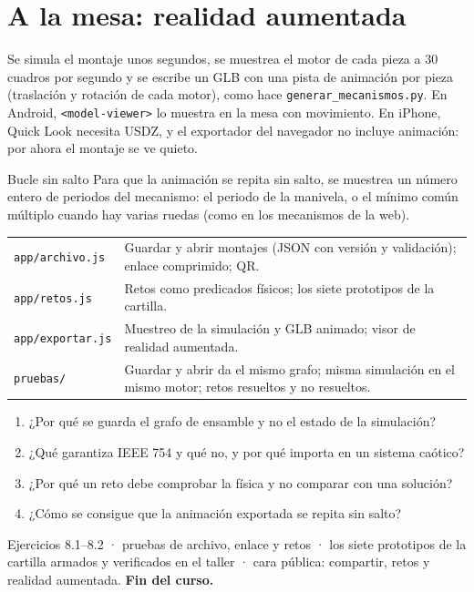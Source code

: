 \documentclass[11pt,a4paper]{article}
\begin{document}
\section{A la mesa: realidad aumentada}

Se simula el montaje unos segundos, se muestrea el motor de cada pieza a 30 cuadros por segundo y se escribe un GLB
con una pista de animación por pieza (traslación y rotación de cada motor), como hace
\texttt{generar\_mecanismos.py}. En Android, \texttt{<model-viewer>} lo muestra en la mesa con movimiento. En iPhone,
Quick Look necesita USDZ, y el exportador del navegador no incluye animación: por ahora el montaje se ve quieto.

\begin{nota}{Bucle sin salto}
Para que la animación se repita sin salto, se muestrea un número entero de periodos del mecanismo: el periodo de la
manivela, o el mínimo común múltiplo cuando hay varias ruedas (como en los mecanismos de la web).
\end{nota}

\begin{codigo}
\begin{tabularx}{\linewidth}{@{}l Y@{}}
\texttt{app/archivo.js} & Guardar y abrir montajes (JSON con versión y validación); enlace comprimido; QR.\\
\texttt{app/retos.js} & Retos como predicados físicos; los siete prototipos de la cartilla.\\
\texttt{app/exportar.js} & Muestreo de la simulación y GLB animado; visor de realidad aumentada.\\
\texttt{pruebas/} & Guardar y abrir da el mismo grafo; misma simulación en el mismo motor; retos resueltos y no
  resueltos.\\
\end{tabularx}
\end{codigo}

\begin{control}
\begin{enumerate}[leftmargin=*]
  \item ¿Por qué se guarda el grafo de ensamble y no el estado de la simulación?
  \item ¿Qué garantiza IEEE 754 y qué no, y por qué importa en un sistema caótico?
  \item ¿Por qué un reto debe comprobar la física y no comparar con una solución?
  \item ¿Cómo se consigue que la animación exportada se repita sin salto?
\end{enumerate}
\end{control}

\begin{cierre}
Ejercicios 8.1--8.2 · pruebas de archivo, enlace y retos · los siete prototipos de la cartilla armados y verificados
en el taller · cara pública: compartir, retos y realidad aumentada. \textbf{Fin del curso.}
\end{cierre}
\end{document}

